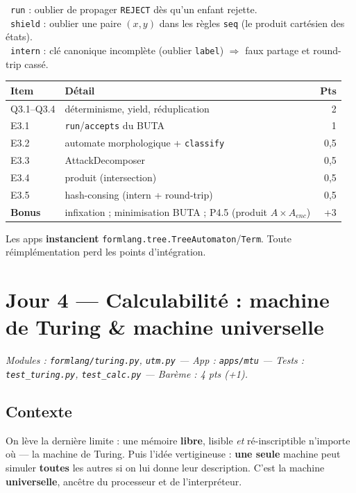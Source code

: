 \documentclass[11pt,a4paper]{scrartcl}
\begin{document}
\begin{notion}
\textbullet\ \texttt{run} : oublier de propager \texttt{REJECT} dès qu'un enfant rejette.\\
\textbullet\ \texttt{shield} : oublier une paire $(x,y)$ dans les règles \texttt{seq}
(le produit cartésien des états).\\
\textbullet\ \texttt{intern} : clé canonique incomplète (oublier \texttt{label}) $\Rightarrow$
faux partage et round-trip cassé.
\end{notion}
\begin{center}\small
\begin{tabular}{@{}llr@{}}
\toprule Item & Détail & Pts\\\midrule
Q3.1–Q3.4 & déterminisme, yield, réduplication & 2\\
E3.1 & \texttt{run}/\texttt{accepts} du BUTA & 1\\
E3.2 & automate morphologique + \texttt{classify} & 0,5\\
E3.3 & AttackDecomposer & 0,5\\
E3.4 & produit (intersection) & 0,5\\
E3.5 & hash-consing (intern + round-trip) & 0,5\\
\textbf{Bonus} & infixation ; minimisation BUTA ; P4.5 (produit $A\times A_{enc}$) & +3\\
\bottomrule
\end{tabular}
\end{center}
\begin{gate}Les apps \textbf{instancient} \texttt{formlang.tree.TreeAutomaton}/\texttt{Term}.
Toute réimplémentation perd les points d'intégration.\end{gate}
\clearpage
\section{Jour 4 — Calculabilité : machine de Turing \& machine universelle}
\emph{Modules : \texttt{formlang/turing.py}, \texttt{utm.py} — App : \texttt{apps/mtu} —
Tests : \texttt{test\_turing.py}, \texttt{test\_calc.py} — Barème : 4 pts (+1).}

\subsection{Contexte}
On lève la dernière limite : une mémoire \textbf{libre}, lisible \emph{et} ré-inscriptible
n'importe où — la machine de Turing. Puis l'idée vertigineuse : \textbf{une seule} machine
peut simuler \textbf{toutes} les autres si on lui donne leur description. C'est la machine
\textbf{universelle}, ancêtre du processeur et de l'interpréteur.
\end{document}
